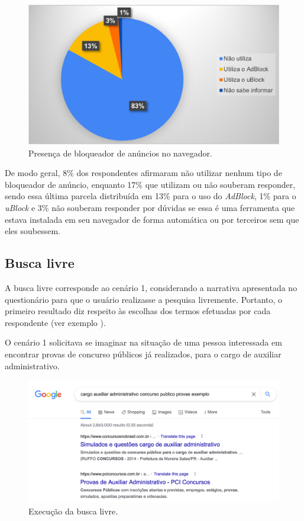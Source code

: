 \documentclass[portuguese]{textolivre}
\begin{document}
\begin{figure}[h!]
    \centering
    \includegraphics[width=0.8\linewidth]{gra-004.pdf}
    \caption{Presença de bloqueador de anúncios no navegador.}
    \label{fig12}
\end{figure}

De modo geral, 8\% dos respondentes afirmaram não utilizar nenhum tipo de bloqueador de anúncio, enquanto 17\% que utilizam ou não souberam responder, sendo essa última parcela distribuída em 13\% para o uso do \textit{AdBlock}, 1\% para o \textit{uBlock} e 3\% não souberam responder por dúvidas se essa é uma ferramenta que estava instalada em seu navegador de forma automática ou por terceiros sem que eles soubessem.

\subsection{Busca livre}\label{sec-idioma}
A busca livre corresponde ao cenário 1, considerando a narrativa apresentada no questionário para que o usuário realizasse a pesquisa livremente. Portanto, o primeiro resultado diz respeito às escolhas dos termos efetuadas por cada respondente (ver exemplo ).

O cenário 1 solicitava se imaginar na situação de uma pessoa interessada em encontrar provas de concurso públicos já realizados, para o cargo de auxiliar administrativo.

\begin{figure}[h!]
    \centering
    \includegraphics[width=0.8\linewidth]{fig-009.png}
    \caption{Execução da busca livre.}
    \label{fig13}
\end{figure}
\end{document}
